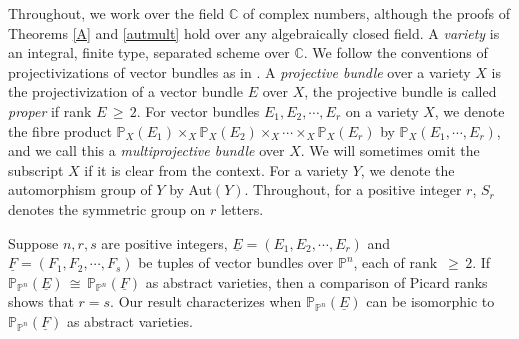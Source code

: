 \documentclass[12pt,reqno]{amsart}
\theoremstyle{definition}
\numberwithin{equation}{section}
\begin{document}
Throughout, we work over the field $\mathbb{C}$ of complex numbers, although the proofs of Theorems \ref{A} and \ref{autmult} hold over any algebraically closed field. A \textit{variety} is an integral, finite type, separated scheme over $\mathbb{C}$. We follow the conventions of projectivizations of vector bundles as in {\cite[Chapter 2, Section 7]{Hart}}. A \textit{projective bundle} over a variety $X$ is the projectivization of a vector bundle $E$ over $X$, the projective bundle is called \textit{proper} if rank $E\,\geq\, 2$. For vector bundles $E_1, E_2,\cdots, E_r$ on a variety $X$, we denote the fibre product $ \mathbb{P}_X(E_{1}) \times_{X} \mathbb{P}_X(E_{2}) \times_{X}\cdots\times_{X }\mathbb{P}_X(E_{r})$ by $ \mathbb{P}_{X}(E_{1},\cdots,E_{r})$, and we call this a \textit{multiprojective bundle} over $X$. We will sometimes omit the subscript $X$ if it is clear from the context. For a variety $Y$, we denote the automorphism group of $Y$ by Aut$(Y)$. Throughout, for a positive integer $r$, $S_r$ denotes the symmetric group on $r$ letters.

Suppose $n,r,s $ are positive integers, $\underline{E}=(E_1, E_2,\cdots, E_r)$ and $\underline{F}=(F_1, F_2,\cdots, F_s)$ be tuples of vector bundles over $\mathbb{P}^n$, each of rank $\,\geq\, 2$. If $\mathbb{P}_{\mathbb{P}^n}(\underline{E}) \,\cong\, \mathbb{P}_{\mathbb{P}^n}(\underline{F})$ as abstract varieties, then a comparison of Picard ranks shows that $r=s$. Our result characterizes when $\mathbb{P}_{\mathbb{P}^n}(\underline{E})$ can be isomorphic to $\mathbb{P}_{\mathbb{P}^n}(\underline{F})$ as abstract varieties.
\end{document}
